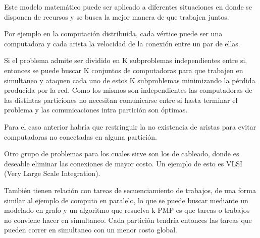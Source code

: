 Este modelo matem\'atico puede ser aplicado a diferentes situaciones
en donde se disponen de recursos y se busca la mejor manera de que
trabajen juntos.

Por ejemplo en la computación distribuida, cada vértice puede ser una
computadora y cada arista la velocidad de la conexión entre un par de
ellas.

Si el problema admite ser dividido en K subproblemas independientes
entre si, 
entonces se puede buscar K conjuntos de computadoras para que trabajen
en simultaneo y ataquen cada uno de estos K subproblemas minimizando
la pérdida producida por la red.
Como los mismos son independientes las computadoras de las distintas
particiones no necesitan comunicarse entre si hasta terminar el
problema y las comunicaciones intra partición son óptimas.

Para el caso anterior habría que restringuir la no existencia de
aristas para evitar computadoras no conectadas en alguna partición.

Otro grupo de problemas para los cuales sirve son los de cableado,
donde es deseable eliminar las conexiones de mayor costo. Un ejemplo
de esto es VLSI (Very Large Scale Integration).

También tienen relación con tareas de secuenciamiento de trabajos, de
una forma similar al ejemplo de computo en paralelo, lo que se puede
buscar mediante un modelado en grafo y un algoritmo que resuelva
k-PMP es que tareas o trabajos no conviene hacer en simultaneo.
Cada partición tendría entonces las tareas que pueden correr en
simultaneo con un menor costo global.